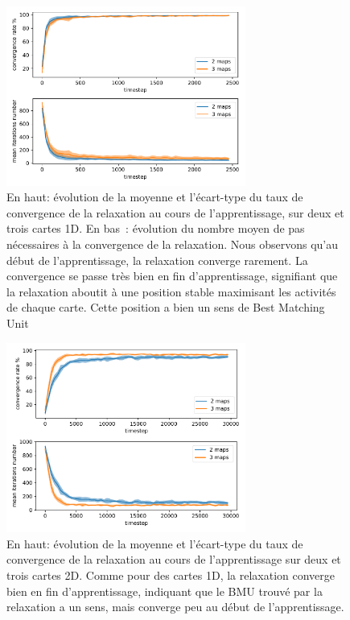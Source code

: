 \documentclass[../main]{subfiles}
\begin{document}
\begin{figure}
	\centering
	\includegraphics[width=0.7\textwidth]{1D_conv_evolution_total.pdf}
	\caption{En haut: évolution de la moyenne et l'écart-type du taux de convergence de la relaxation au cours de l'apprentissage, sur deux et trois cartes 1D. En bas~: évolution du nombre moyen de pas nécessaires à la convergence de la relaxation. Nous observons qu'au début de l'apprentissage, la relaxation converge rarement. La convergence se passe très bien en fin d'apprentissage, signifiant que la relaxation aboutit à une position stable maximisant les activités de chaque carte. Cette position a bien un sens de \og Best Matching Unit \fg{}}
	\label{fig:conv_evolution}
	\end{figure}

\begin{figure}
	\centering
	\includegraphics[width=0.7\textwidth]{2D_conv_evolution_total.pdf}
	\caption{En haut: évolution de la moyenne et l'écart-type du taux de convergence de la relaxation au cours de l'apprentissage sur deux et trois cartes 2D. 
	Comme pour des cartes 1D, la relaxation converge bien en fin d'apprentissage, indiquant que le BMU trouvé par la relaxation a un sens, mais converge peu au début de l'apprentissage.}
	\label{fig:conv_evolution2D}
	\end{figure}
\end{document}
